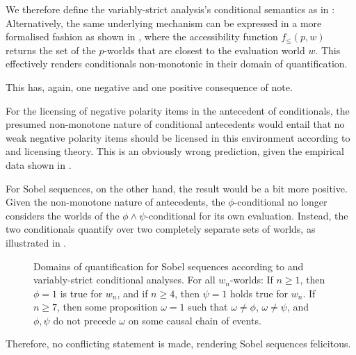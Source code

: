 \noindent We therefore define the variably-strict analysis's conditional semantics as in :
\ex{}\xe
Alternatively, the same underlying mechanism can be expressed in a more formalised fashion as shown in , where the accessibility function $f_\leqslant(p,w)$ returns the set of the $p$-worlds that are closest to the evaluation world $w$.\enlargethispage*{1.5\baselineskip}
\ex{}\xe\newpage
\noindent This effectively renders conditionals non-monotonic in their domain of quantification. 
\ex{}\label{def:nm-intro}%

\xe
This has, again, one negative and one positive consequence of note.

For the licensing of negative polarity items in the antecedent of conditionals, the presumed non-monotone nature of conditional antecedents would entail that no weak negative polarity items should be licensed in this environment according to \textcite{Fauconnier1975a,Fauconnier1975b} and  licensing theory. This is an obviously wrong prediction, given the empirical data shown in .

For Sobel sequences, on the other hand, the result would be a bit more positive. Given the non-monotone nature of antecedents, the $\phi$-conditional no longer considers the worlds of the $\phi\land\psi$-conditional for its own evaluation. Instead, the two conditionals quantify over two completely separate sets of worlds, as illustrated in .
\begin{figure}[!htb]

\caption{Domains of quantification for Sobel sequences according to \textcite{Stalnaker1968} and  variably-strict conditional analyses. For all $w_n$-worlds: If $n\geqslant1$, then $\phi=1$ is true for $w_n$, and if $n\geqslant 4$, then $\psi=1$ holds true for $w_n$. If $n\geqslant 7$, then some proposition $\omega=1$ such that $\omega\neq\phi$, $\omega\neq\psi$, and $\phi,\psi$ do not precede $\omega$ on some causal chain of events.}
\end{figure}

\noindent Therefore, no conflicting statement is made, rendering Sobel sequences felicitous.

